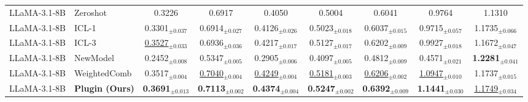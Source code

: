 \begin{table*}[t]
{\begin{tabular}{|llccccccc|}
        LLaMA-3.1-8B & Zeroshot & 0.3226 & 0.6917 & 0.4050 & 0.5004 & 0.6041 & 0.9764 &  1.1310 \\
        LLaMA-3.1-8B & ICL-1 & 0.3301$_{\pm0.037}$ & 0.6914$_{\pm0.027}$ & 0.4126$_{\pm0.026}$ & 0.5023$_{\pm0.018}$ & 0.6037$_{\pm0.015}$ & 0.9715$_{\pm0.057}$ & 1.1735$_{\pm0.066}$\\
        LLaMA-3.1-8B & ICL-3 & \underline{0.3527}$_{\pm0.033}$ & 0.6936$_{\pm0.036}$ & 0.4217$_{\pm0.017}$ & 0.5127$_{\pm0.017}$ & 0.6202$_{\pm0.009}$ & 0.9927$_{\pm0.018}$ & 1.1672$_{\pm0.047}$\\
        LLaMA-3.1-8B & NewModel & 0.2452$_{\pm0.008}$ & 0.5347$_{\pm0.005}$ & 0.2905$_{\pm0.006}$ & 0.4097$_{\pm0.005}$ & 0.4812$_{\pm0.009}$ & 0.4571$_{\pm0.021}$ & \textbf{1.2281}$_{\pm0.041}$\\
        LLaMA-3.1-8B & WeightedComb & 0.3517$_{\pm0.004}$ & \underline{0.7040}$_{\pm0.004}$ & \underline{0.4249}$_{\pm0.004}$ & \underline{0.5181}$_{\pm0.003}$ & \underline{0.6206}$_{\pm0.002}$ & \underline{1.0947}$_{\pm0.010}$ & 1.1737$_{\pm0.015}$\\
        LLaMA-3.1-8B & \textbf{Plugin (Ours)} & \textbf{0.3691}$_{\pm0.013}$ & \textbf{0.7113}$_{\pm0.002}$ & \textbf{0.4374}$_{\pm0.004}$ & \textbf{0.5247}$_{\pm0.002}$ & \textbf{0.6392}$_{\pm0.009}$ & \textbf{1.1441}$_{\pm0.030}$ & \underline{1.1749}$_{\pm0.034}$\\
        
        \hline
    \end{tabular}
    }
    \vspace{-3mm}
\end{table*}

